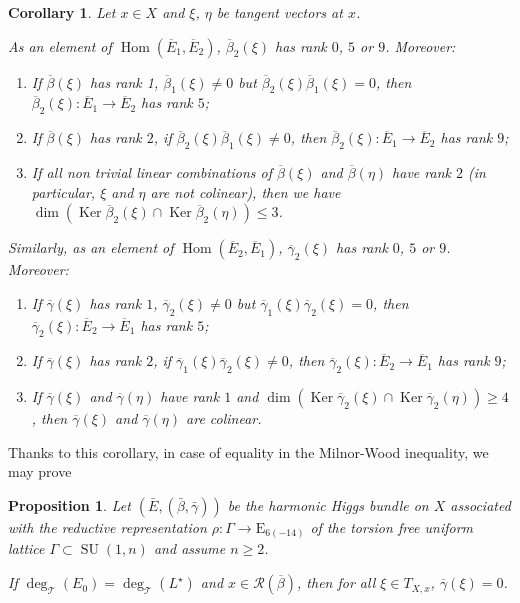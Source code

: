 \documentclass[10pt]{amsart}
\let\mathcal\mathscr
\newenvironment{enumeratea}
{\bgroup\def\theenumi{\alph{enumi}}\begin{enumerate}}
{\end{enumerate}\egroup}
\newenvironment{enumerateap}
{\bgroup\def\theenumi{\alph{enumi}$'$}\begin{enumerate}}
{\end{enumerate}\egroup}
\theoremstyle{plain}
\newtheorem{prop}[theo]{Proposition}
\newtheorem{coro}[theo]{Corollary}
\theoremstyle{definition}
\let\ov\overline
\DeclareMathOperator{\Hom}{Hom}
\DeclareMathOperator{\Ker}{Ker}
\DeclareMathOperator{\SU}{SU}
\newcommand{\cR}{\mathcal{R}}
\newcommand{\cT}{\mathcal{T}}
\newcommand{\ovE}{\ov{E}}
\newcommand{\ovb}{\ov{\beta}}
\newcommand{\ovg}{\ov{\gamma}}
\begin{document}
\begin{coro}\label{lem:ranks} Let $x\in X$ and $\xi$, $\eta$ be tangent vectors at $x$.

As an element of $\Hom(\ovE_1,\ovE_2)$, $\ovb_2(\xi)$ has rank
$0$, $5$ or $9$. Moreover:
\begin{enumeratea}
\item If $\ovb(\xi)$ has rank 1, \ie $\ovb_1(\xi)\neq 0$ but $\ovb_2(\xi)\ovb_1(\xi)=0$, then $\ovb_2(\xi):\ovE_1\to \ovE_2$ has rank $5$;

\item If $\ovb(\xi)$ has rank $2$, \ie if $\ovb_2(\xi)\ovb_1(\xi)\neq 0$, then $\ovb_2(\xi):\ovE_1\to \ovE_2$ has rank $9$;

\item If all non trivial linear combinations of $\ovb(\xi)$ and $\ovb(\eta)$ have rank
$2$ (in particular, $\xi$ and $\eta$ are not colinear), then we have
$\dim(\Ker\ovb_2(\xi)\cap\Ker\ovb_2(\eta))\leq 3$.
\end{enumeratea}

Similarly, as an element of $\Hom(\ovE_2,\ovE_1)$, $\ovg_2(\xi)$ has rank
$0$, $5$ or $9$. Moreover:
\begin{enumerateap}
\item If $\ovg(\xi)$ has rank $1$, \ie $\ovg_2(\xi)\neq 0$ but $\ovg_1(\xi)\ovg_2(\xi)=0$, then $\ovg_2(\xi):\ovE_2\to \ovE_1$ has rank $5$;

\item If $\ovg(\xi)$ has rank $2$, \ie if $\ovg_1(\xi)\ovg_2(\xi)\neq 0$, then $\ovg_2(\xi):\ovE_2\to \ovE_1$ has rank $9$;

\item If $\ovg(\xi)$ and $\ovg(\eta)$ have rank $1$ and $\dim (\Ker \ovg_2(\xi) \cap \Ker \ovg_2(\eta)) \geq 4$, then
$\ovg(\xi)$ and $\ovg(\eta)$ are colinear.
\end{enumerateap}
\end{coro}

Thanks to this corollary, in case of equality in the Milnor-Wood inequality, we may prove

\begin{prop}\label{prop:vanishing} Let $(\bar E, (\bar\beta,\bar\gamma))$ be the harmonic Higgs bundle on $X$
associated with the reductive representation $\rho:\Gamma\to \mathrm{E}_{6(-14)}$ of the torsion free
uniform lattice
$\Gamma\subset\SU(1,n)$ and assume
$n\geq 2$.

If $\deg_\cT(E_0)=\deg_\cT(L^\star)$ and $x\in\cR(\ovb)$, then for all $\xi\in T_{X,x}$, $\ovg(\xi)=0$.
\end{prop}
\end{document}

